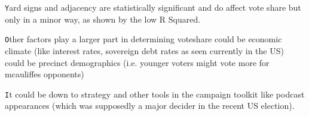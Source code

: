 \documentclass[12pt,letterpaper]{article}
\begin{document}
\begin{enumerate}
	\texttt Yard signs and adjacency are statistically significant and do affect vote share but only in a minor way, as shown by the low R Squared.
	
	\vspace{0.5cm}
	
	\texttt Other factors play a larger part in determining voteshare could be economic climate (like interest rates, sovereign debt rates as seen currently in the US) could be precinct demographics (i.e. younger voters might vote more for mcauliffes opponents)
	
	\vspace{0.5cm}
	
	\texttt It could be down to strategy and other tools in the campaign toolkit like podcast appearances (which was supposedly a major decider in the recent US election).
	
	\vspace{0.5cm}
	
	
\end{enumerate}  
\end{document}
